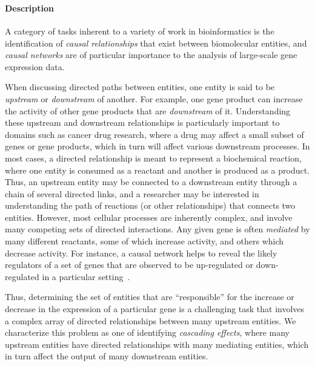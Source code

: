 \documentclass[twocolumn]{bmcart}%
\begin{document}
\ \\ \

\paragraph*{Description}

A category of tasks inherent to a variety of work in bioinformatics is the identification of \textit{causal relationships} that exist between biomolecular entities, and \emph{causal networks} are of particular importance to the analysis of large-scale gene expression data.

When discussing directed paths between entities, one entity is said to be \emph{upstream} or \emph{downstream} of another.
For example, one gene product can increase the activity of other gene products that are \emph{downstream} of it.
Understanding these upstream and downstream relationships is particularly important to domains such as cancer drug research, where a drug may affect a small subset of genes or gene products, which in turn will affect various downstream processes.
In most cases, a directed relationship is meant to represent a biochemical reaction, where one entity is consumed as a reactant and another is produced as a product.
Thus, an upstream entity may be connected to a downstream entity through a chain of several directed links, and a researcher may be interested in understanding the path of reactions (or other relationships) that connects two entities.
However, most cellular processes are inherently complex, and involve many competing sets of directed interactions.
Any given gene is often \textit{mediated} by many different reactants, some of which increase activity, and others which decrease activity.
For instance, a causal network helps to reveal the likely regulators of a set of genes that are observed to be up-regulated or down-regulated in a particular setting~\cite{felciano2013predictive, Kramer2013ipa-causal}.

Thus, determining the set of entities that are ``responsible'' for the increase or decrease in the expression of a particular gene is a challenging task that involves a complex array of directed relationships between many upstream entities.
We characterize this problem as one of identifying \textit{cascading effects}, where many upstream entities have directed relationships with many mediating entities, which in turn affect the output of many downstream entities.
\end{document}
